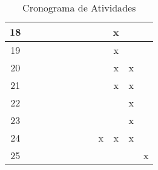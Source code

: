 \begin{table}[!h]
\begin{tabular}{|c|c|c|c|c|c|c|c|c|c|c|c|}
        18    &      &      &      &      &     &     &     &     & x   &     &     \\ \hline
        19    &      &      &      &      &     &     &     &     & x   &     &     \\ \hline
        20    &      &      &      &      &     &     &     &     & x   & x   &     \\ \hline
        21    &      &      &      &      &     &     &     &     & x   & x   &     \\ \hline
        22    &      &      &      &      &     &     &     &     &     & x   &     \\ \hline
        23    &      &      &      &      &     &     &     &     &     & x   &     \\ \hline
        24    &      &      &      &      &     &     &     & x   & x   & x   &     \\ \hline
        25    &      &      &      &      &     &     &     &     &     &     & x   \\ \hline
    \end{tabular}
    \caption{Cronograma de Atividades}
    \label{table_cronograma}
\end{table}